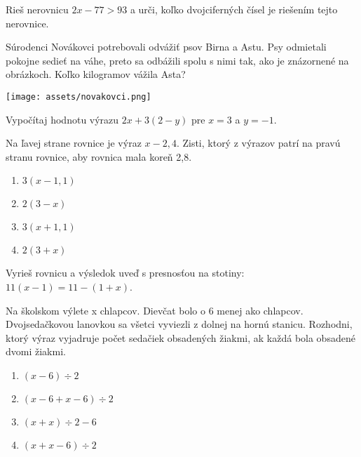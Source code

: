 \begin{example}
	Rieš nerovnicu $2x - 77 > 93$ a urči, koľko dvojciferných čísel je riešením tejto nerovnice.
\end{example}

\begin{example}
	Súrodenci Novákovci potrebovali odvážiť psov Birna a Astu. Psy odmietali pokojne sedieť na váhe, preto sa odbážili spolu s nimi tak, ako je znázornené na obrázkoch. Koľko kilogramov vážila Asta?
	
	\begin{center}
		\texttt{[image: assets/novakovci.png]}
	\end{center}
\end{example}

\begin{example}
	Vypočítaj hodnotu výrazu $2x + 3(2 - y)$ pre $x = 3$ a $y = -1$.
\end{example}

\begin{example}
	Na ľavej strane rovnice je výraz $x - 2,4$. Zisti, ktorý z výrazov patrí na pravú stranu rovnice, aby rovnica mala koreň 2,8.
	
	\begin{enumerate}
		\item $3(x - 1,1)$
		\item $2(3 - x)$
		\item $3(x + 1,1)$
		\item $2(3 + x)$
	\end{enumerate}
\end{example}

\begin{example}
	Vyrieš rovnicu a výsledok uveď s presnosťou na stotiny: $11(x-1) = 11 - (1 + x)$.
\end{example}

\begin{example}
	Na školskom výlete x chlapcov. Dievčat bolo o 6 menej ako chlapcov. Dvojsedačkovou lanovkou sa všetci vyviezli z dolnej na hornú stanicu. Rozhodni, ktorý výraz vyjadruje počet sedačiek obsadených žiakmi, ak každá bola obsadené dvomi žiakmi.
	
	\begin{enumerate}
		\item $(x - 6) \div 2$
		\item  $(x - 6 + x - 6) \div 2$
		\item $(x + x) \div 2 - 6$
		\item $(x + x - 6) \div 2$
	\end{enumerate} 
\end{example}

